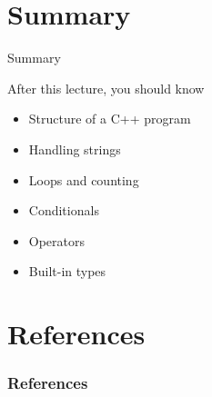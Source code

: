 \documentclass[\classoption]{beamer}
\begin{document}
\section{Summary}

\begin{frame}{Summary}
\begin{block}{After this lecture, you should know}
\begin{itemize}
\item Structure of a C++ program
\item Handling strings
\item Loops and counting
\item Conditionals
\item Operators
\item Built-in types
\end{itemize}
\end{block}
\end{frame}

\section{References}

\begin{frame}[t, allowframebreaks]
\frametitle{References}


\end{frame}
\end{document}
